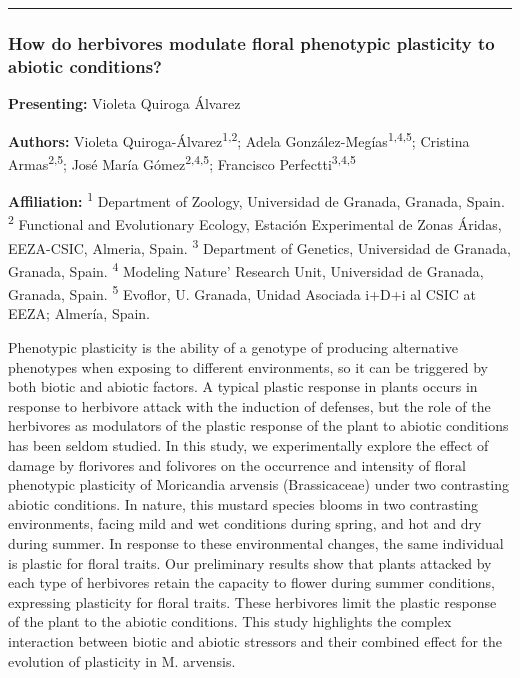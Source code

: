 \documentclass[
  letterpaper,
  DIV=11,
  numbers=noendperiod]{scrartcl}
\begin{document}
\begin{center}\rule{0.5\linewidth}{0.5pt}\end{center}

\subsubsection{How do herbivores modulate floral phenotypic plasticity
to abiotic
conditions?}\label{how-do-herbivores-modulate-floral-phenotypic-plasticity-to-abiotic-conditions}

\textbf{Presenting:} Violeta Quiroga Álvarez

\textbf{Authors:} Violeta Quiroga-Álvarez\textsuperscript{1,2}; Adela
González-Megías\textsuperscript{1,4,5}; Cristina
Armas\textsuperscript{2,5}; José María Gómez\textsuperscript{2,4,5};
Francisco Perfectti\textsuperscript{3,4,5}

\textbf{Affiliation:} \textsuperscript{1} Department of Zoology,
Universidad de Granada, Granada, Spain. \textsuperscript{2} Functional
and Evolutionary Ecology, Estación Experimental de Zonas Áridas,
EEZA-CSIC, Almeria, Spain. \textsuperscript{3} Department of Genetics,
Universidad de Granada, Granada, Spain. \textsuperscript{4} Modeling
Nature' Research Unit, Universidad de Granada, Granada, Spain.
\textsuperscript{5} Evoflor, U. Granada, Unidad Asociada i+D+i al CSIC
at EEZA; Almería, Spain.

Phenotypic plasticity is the ability of a genotype of producing
alternative phenotypes when exposing to different environments, so it
can be triggered by both biotic and abiotic factors. A typical plastic
response in plants occurs in response to herbivore attack with the
induction of defenses, but the role of the herbivores as modulators of
the plastic response of the plant to abiotic conditions has been seldom
studied. In this study, we experimentally explore the effect of damage
by florivores and folivores on the occurrence and intensity of floral
phenotypic plasticity of Moricandia arvensis (Brassicaceae) under two
contrasting abiotic conditions. In nature, this mustard species blooms
in two contrasting environments, facing mild and wet conditions during
spring, and hot and dry during summer. In response to these
environmental changes, the same individual is plastic for floral traits.
Our preliminary results show that plants attacked by each type of
herbivores retain the capacity to flower during summer conditions,
expressing plasticity for floral traits. These herbivores limit the
plastic response of the plant to the abiotic conditions. This study
highlights the complex interaction between biotic and abiotic stressors
and their combined effect for the evolution of plasticity in M.
arvensis.
\end{document}
